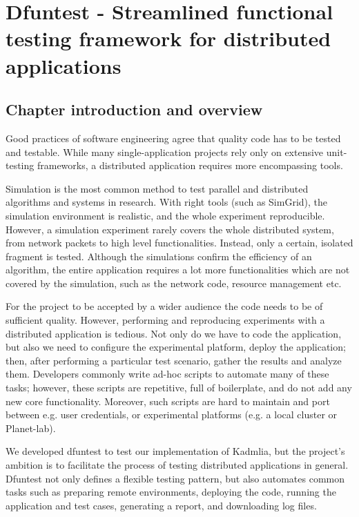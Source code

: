 \chapter{Dfuntest - Streamlined functional testing framework for distributed applications}
\section{Chapter introduction and overview}
Good practices of software engineering agree \cite{mccon04} that quality code has to be tested and testable.
While many single-application projects rely only on extensive unit-testing frameworks, a distributed application requires more encompassing tools.

Simulation is the most common method to test parallel and distributed algorithms and systems in research.
With right tools (such as SimGrid\cite{cas08}), the simulation environment is realistic, and the whole experiment reproducible.
However, a simulation experiment rarely covers the whole distributed system, from network packets to high level functionalities.
Instead, only a certain, isolated fragment is tested.
Although the simulations confirm the efficiency of an algorithm, the entire application requires a lot more functionalities which are not covered by the simulation, such as the network code, resource management etc.

For the project to be accepted by a wider audience the code needs to be of sufficient quality.
However, performing and reproducing experiments with a distributed application is tedious.
Not only do we have to code the application, but also we need to configure the experimental platform, deploy the application; then, after performing a particular test scenario, gather the results and analyze them.
Developers commonly write ad-hoc scripts to automate many of these tasks; however, these scripts are repetitive, full of boilerplate, and do not add any new core functionality.
Moreover, such scripts are hard to maintain and port between e.g. user credentials, or experimental platforms (e.g. a local cluster or Planet-lab).

We developed dfuntest to test our implementation of Kadmlia, but the project's ambition is to facilitate the process of testing distributed applications in general. 
Dfuntest not only defines a flexible testing pattern, but also automates common tasks such as preparing remote environments, deploying the code, running the application and test cases, generating a report, and downloading log files.

